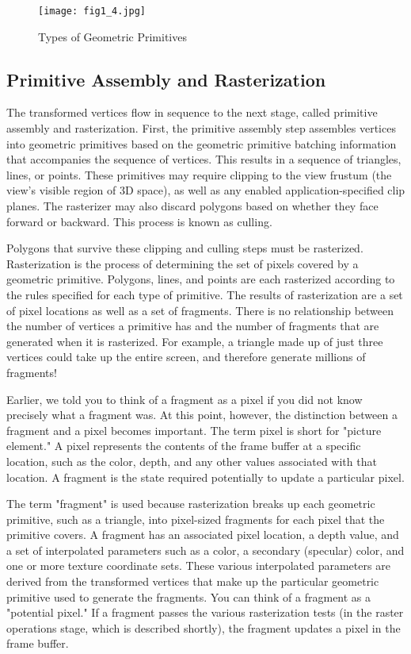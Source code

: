 \documentclass[../main.tex]{subfiles}
\begin{document}
\begin{figure}
    \centering
    \texttt{[image: fig1\_4.jpg]}
    \caption{Types of Geometric Primitives}
    \label{fig:1-4}
\end{figure}

\subsection*{Primitive Assembly and Rasterization}

The transformed vertices flow in sequence to the next stage, called primitive assembly and rasterization. First, the primitive assembly step assembles vertices into geometric primitives based on the geometric primitive batching information that accompanies the sequence of vertices. This results in a sequence of triangles, lines, or points. These primitives may require clipping to the view frustum (the view's visible region of 3D space), as well as any enabled application-specified clip planes. The rasterizer may also discard polygons based on whether they face forward or backward. This process is known as culling.

Polygons that survive these clipping and culling steps must be rasterized. Rasterization is the process of determining the set of pixels covered by a geometric primitive. Polygons, lines, and points are each rasterized according to the rules specified for each type of primitive. The results of rasterization are a set of pixel locations as well as a set of fragments. There is no relationship between the number of vertices a primitive has and the number of fragments that are generated when it is rasterized. For example, a triangle made up of just three vertices could take up the entire screen, and therefore generate millions of fragments!

Earlier, we told you to think of a fragment as a pixel if you did not know precisely what a fragment was. At this point, however, the distinction between a fragment and a pixel becomes important. The term pixel is short for "picture element." A pixel represents the contents of the frame buffer at a specific location, such as the color, depth, and any other values associated with that location. A fragment is the state required potentially to update a particular pixel.

The term "fragment" is used because rasterization breaks up each geometric primitive, such as a triangle, into pixel-sized fragments for each pixel that the primitive covers. A fragment has an associated pixel location, a depth value, and a set of interpolated parameters such as a color, a secondary (specular) color, and one or more texture coordinate sets. These various interpolated parameters are derived from the transformed vertices that make up the particular geometric primitive used to generate the fragments. You can think of a fragment as a "potential pixel." If a fragment passes the various rasterization tests (in the raster operations stage, which is described shortly), the fragment updates a pixel in the frame buffer.
\end{document}
